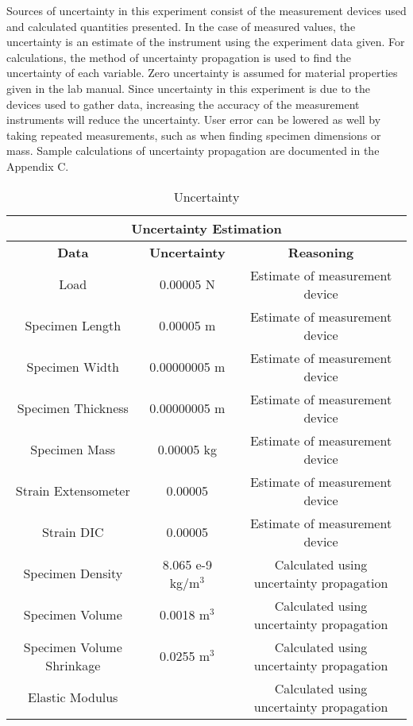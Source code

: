 Sources of uncertainty in this experiment consist of the measurement devices used and calculated quantities presented. In the case of measured values, the uncertainty is an estimate of the instrument using the experiment data given. For calculations, the method of uncertainty propagation is used to find the uncertainty of each variable. Zero uncertainty is assumed for material properties given in the lab manual. Since uncertainty in this experiment is due to the devices used to gather data, increasing the accuracy of the measurement instruments will reduce the uncertainty. User error can be lowered as well by taking repeated measurements, such as when finding specimen dimensions or mass. Sample calculations of uncertainty propagation are documented in the Appendix C.       
\begin{table}[!h]
    \centering
    \caption{Uncertainty \cite{labmanual}}
    \begin{tabular}{|c|c|c|}\toprule
        \multicolumn{3}{c}{\textbf{Uncertainty Estimation}} \\ \midrule
        \textbf{Data} & \textbf{Uncertainty} & \textbf{Reasoning} \\ \hline\hline
        Load                        & 0.00005 N  & Estimate of measurement device \\\hline
        Specimen Length         & 0.00005 m  & Estimate of measurement device  \\\hline
        Specimen Width         & 0.00000005 m  & Estimate of measurement device  \\\hline
        Specimen Thickness         & 0.00000005 m  & Estimate of measurement device  \\\hline
        Specimen Mass             &  0.00005 kg & Estimate of measurement device\\\hline
        Strain Extensometer         & 0.00005 & Estimate of measurement device  \\\hline
        Strain DIC                  & 0.00005 & Estimate of measurement device  \\\hline
        Specimen Density            & 8.065 e-9 kg/m$^3$ & Calculated using uncertainty propagation  \\\hline
        Specimen Volume             & 0.0018 m$^3$ & Calculated using uncertainty propagation  \\\hline
        Specimen Volume Shrinkage   & 0.0255 m$^3$ & Calculated using uncertainty propagation  \\\hline
        Elastic Modulus             &  & Calculated using uncertainty propagation  \\\hline

\end{tabular}
\end{table}
